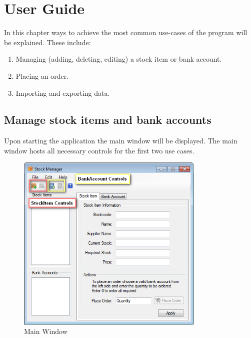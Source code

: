 \chapter{User Guide}\label{ch:user_guide} %

In this chapter ways to achieve the most common use-cases of the program will be explained. These include:

\begin{enumerate}
\item Managing (adding, deleting, editing) a stock item or bank account.
\item Placing an order.
\item Importing and exporting data.
\end{enumerate}

\section{Manage stock items and bank accounts}
\label{sec:manage_stock_item}

Upon starting the application the main window will be displayed.
The main window hosts all necessary controls for the first two use cases.

\begin{figure}[H]
\begin{center}
\includegraphics[width=0.8\textwidth]{gfx/main_window.png}
\caption{Main Window}
\label{fig:main_window}
\end{center}
\end{figure}


